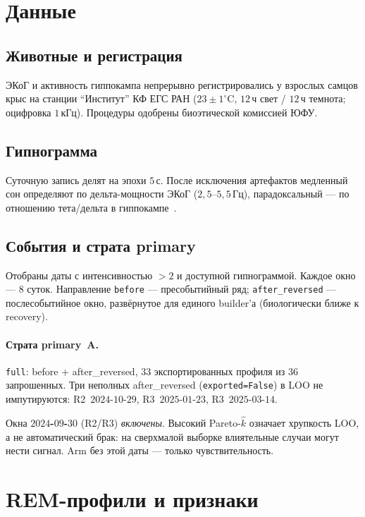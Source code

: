 \documentclass{article}
\begin{document}
\section{Данные}

\subsection{Животные и регистрация}

ЭКоГ и активность гиппокампа непрерывно регистрировались у
взрослых самцов крыс на станции ``Институт'' КФ ЕГС РАН
($23\pm1^{\circ}$C, $12$\,ч свет / $12$\,ч темнота; оцифровка
$1$\,кГц). Процедуры одобрены биоэтической комиссией ЮФУ.

\subsection{Гипнограмма}

Суточную запись делят на эпохи $5$\,с. После исключения
артефактов медленный сон определяют по дельта-мощности ЭКоГ
($2{,}5$--$5{,}5$\,Гц), парадоксальный --- по отношению
тета/дельта в гиппокампе~\cite{Fang2010,Vyazovskiy2005,Saevskiy2025}.

\subsection{События и страта primary}

Отобраны даты с интенсивностью $>2$ и доступной гипнограммой.
Каждое окно --- $8$ суток. Направление \texttt{before} ---
пресобытийный ряд; \texttt{after\_reversed} --- послесобытийное
окно, развёрнутое для единого builder'а (биологически ближе к
recovery).

\paragraph{Страта primary~A.}
\texttt{full}: before + after\_reversed, $33$ экспортированных
профиля из $36$ запрошенных. Три неполных after\_reversed
(\texttt{exported=False}) в LOO не импутируются:
R2~$2024$-$10$-$29$, R3~$2025$-$01$-$23$, R3~$2025$-$03$-$14$.

Окна \textbf{$2024$-$09$-$30$} (R2/R3) \emph{включены}. Высокий
Pareto-$\hat k$ означает хрупкость LOO, а не автоматический брак:
на сверхмалой выборке влиятельные случаи могут нести сигнал.
Arm без этой даты --- только чувствительность.

\section{REM-профили и признаки}
\end{document}
